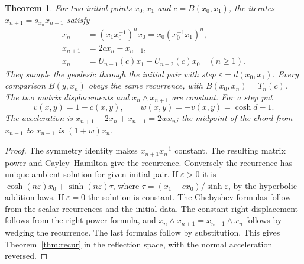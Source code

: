 \documentclass[11pt,reqno]{amsart}
\newtheorem{theorem}{Theorem}[section]
\theoremstyle{definition}
\theoremstyle{remark}
\numberwithin{equation}{section}
\begin{document}
\begin{theorem}\label{m3:recurrence}
For two initial points \(x_0,x_1\) and \(c=B(x_0,x_1)\), the iterates
\(x_{n+1}=s_{x_n}x_{n-1}\) satisfy
\begin{align*}
 x_n&=(x_1x_0^{-1})^n x_0=x_0(x_0^{-1}x_1)^n,\\
 x_{n+1}&=2cx_n-x_{n-1},\\
 x_n&=U_{n-1}(c)x_1-U_{n-2}(c)x_0\quad(n\ge1).
\end{align*}
They sample the geodesic through the initial pair with step
\(\varepsilon=d(x_0,x_1)\).
Every comparison \(B(y,x_n)\) obeys the same recurrence, with
\(B(x_0,x_n)=T_n(c)\). The two matrix displacements and
\(x_n\wedge x_{n+1}\) are constant. For a step put
\[
 v(x,y)=1-c(x,y),\qquad w(x,y)=-v(x,y)=\cosh d-1.
\]
The acceleration is \(x_{n+1}-2x_n+x_{n-1}=2w x_n\);
the midpoint of the chord from \(x_{n-1}\) to \(x_{n+1}\) is
\((1+w)x_n\).
\end{theorem}
\begin{proof}
The symmetry identity makes \(x_{n+1}x_n^{-1}\) constant.
The resulting matrix power and Cayley--Hamilton give the recurrence.
Conversely the recurrence has unique ambient solution for given initial
pair. If \(\varepsilon>0\) it is
\(\cosh(n\varepsilon)x_0+\sinh(n\varepsilon)\tau\), where
\(\tau=(x_1-cx_0)/\sinh\varepsilon\), by the hyperbolic addition laws.
If \(\varepsilon=0\) the solution is constant. The Chebyshev formulas
follow from the scalar recurrences and the initial data. The
constant right displacement follows from the right-power formula,
and \(x_n\wedge x_{n+1}=x_{n-1}\wedge x_n\) follows by wedging the
recurrence. The last formulas follow by substitution. This gives
Theorem~\ref{thm:recur} in the reflection space, with the normal
acceleration reversed.
\end{proof}
\end{document}
